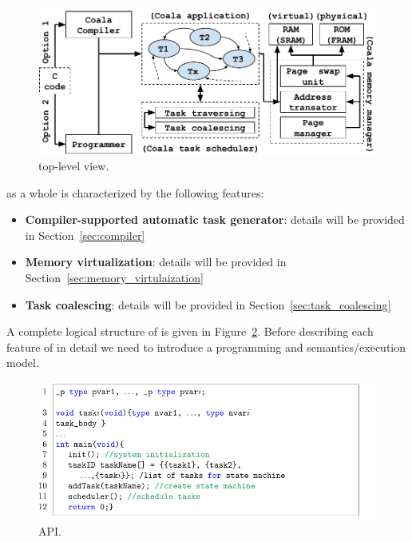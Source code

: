 \begin{figure}
	\centering
	\includegraphics[width=\columnwidth]{figures/viper_block_diagram}
	\caption{\sys top-level view.}
	\label{fig:system_overview}
\end{figure}

\sys as a whole is characterized by the following features:

\begin{itemize}
	\item \textbf{Compiler-supported automatic task generator}: details will be provided in Section~\ref{sec:compiler}
	\item \textbf{Memory virtualization}: details will be provided in Section~\ref{sec:memory_virtulaization}
	\item \textbf{Task coalescing}: details will be provided in Section~\ref{sec:task_coalescing}
\end{itemize}

A complete logical structure of \sys is given in Figure~\ref{fig:system_overview}. Before describing each feature of \sys in detail we need to introduce a programming and semantics/execution model.

\begin{figure}
	\centering
	\includegraphics[width=\columnwidth]{figures/taskification_example}
	\caption{\sys API.}
	\label{fig:system_overview}
\end{figure}


